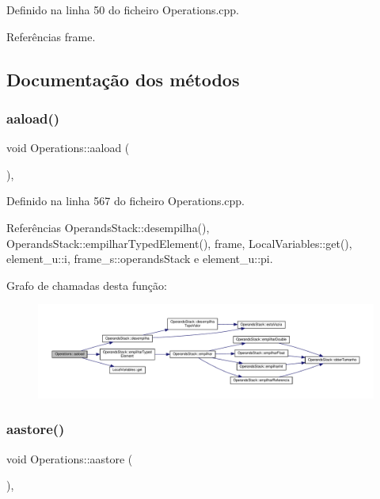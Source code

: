 Definido na linha 50 do ficheiro Operations.\+cpp.



Referências frame.



\subsection{Documentação dos métodos}
\mbox{\label{classOperations_a522dfa2224d54268008f3bec4ff2b388}} 
\subsubsection{\texorpdfstring{aaload()}{aaload()}}
{\footnotesize\ttfamily void Operations\+::aaload (\begin{DoxyParamCaption}{ }\end{DoxyParamCaption})\hspace{0.3cm}{\ttfamily [static]}, {\ttfamily [private]}}



Definido na linha 567 do ficheiro Operations.\+cpp.



Referências Operands\+Stack\+::desempilha(), Operands\+Stack\+::empilhar\+Typed\+Element(), frame, Local\+Variables\+::get(), element\+\_\+u\+::i, frame\+\_\+s\+::operands\+Stack e element\+\_\+u\+::pi.

Grafo de chamadas desta função\+:\nopagebreak
\begin{figure}[H]
\begin{center}
\leavevmode
\includegraphics[width=350pt]{classOperations_a522dfa2224d54268008f3bec4ff2b388_cgraph}
\end{center}
\end{figure}
\mbox{\label{classOperations_a60b30bd84b2d59334e735f0adda6febe}} 
\subsubsection{\texorpdfstring{aastore()}{aastore()}}
{\footnotesize\ttfamily void Operations\+::aastore (\begin{DoxyParamCaption}{ }\end{DoxyParamCaption})\hspace{0.3cm}{\ttfamily [static]}, {\ttfamily [private]}}



